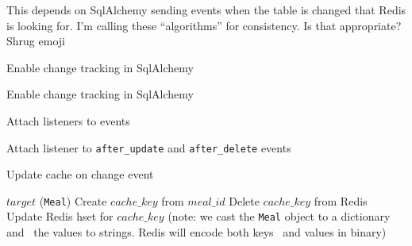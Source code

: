 This depends on SqlAlchemy sending events when the table is changed that Redis is looking for.
I'm calling these ``algorithms'' for consistency. Is that appropriate? Shrug emoji

\begin{algorithm}
\caption{Enable change tracking in SqlAlchemy}
    \begin{algorithmic}
        \STATE Enable change tracking in SqlAlchemy
    \end{algorithmic}
\end{algorithm}

\begin{algorithm}
\caption{Attach listeners to events}
    \begin{algorithmic}
        \STATE Attach listener to \texttt{after\_update} and \texttt{after\_delete} events
    \end{algorithmic}
\end{algorithm}

\begin{algorithm}
\caption{Update cache on change event}
    \begin{algorithmic}
        \REQUIRE $target$ (\texttt{Meal})
        \STATE Create $cache\_key$ from $meal\_id$
            \STATE Delete $cache\_key$ from Redis
        \ELSE
            \STATE Update Redis hset for $cache\_key$
            \STATE \hspace{2em} (note: we cast the \texttt{Meal} object to a dictionary and
            \STATE \hspace{2em} ~the values to strings. Redis will encode both keys
            \STATE \hspace{2em} ~and values in binary)
        \ENDIF
    \end{algorithmic}
\end{algorithm}
